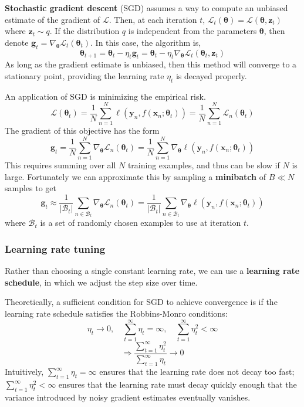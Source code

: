 \documentclass[11pt]{article}
\begin{document}
\textbf{Stochastic gradient descent} (SGD) assumes a way to compute an unbiased estimate of the gradient of $\mathcal{L}$.
Then, at each iteration $t$, $\mathcal{L}_t(\boldsymbol{\theta}) = \mathcal{L}(\boldsymbol{\theta}, \boldsymbol{z}_t)$ where $\boldsymbol{z}_t \sim q$.
If the distribution $q$ is independent from the parameters $\boldsymbol{\theta}$, then denote $\boldsymbol{g}_t = \nabla_{\boldsymbol{\theta}} \mathcal{L}_t(\boldsymbol{\theta}_t)$.
In this case, the algorithm is,
\[
\boldsymbol{\theta}_{t+1} = \boldsymbol{\theta}_t - \eta_t \boldsymbol{g}_t = \boldsymbol{\theta}_t - \eta_t \nabla_{\boldsymbol{\theta}} \mathcal{L}_t(\boldsymbol{\theta}_t, \boldsymbol{z}_t)
\]
As long as the gradient estimate is unbiased, then this method will converge to a stationary point, providing the learning rate $\eta_t$ is decayed properly.

An application of SGD is minimizing the empirical risk. 
\[
\mathcal{L}(\boldsymbol{\theta}_t) = \frac{1}{N} \sum_{n=1}^{N} \ell(\boldsymbol{y}_n, f(\boldsymbol{x}_n; \boldsymbol{\theta}_t)) = \frac{1}{N} \sum_{n=1}^{N} \mathcal{L}_n(\boldsymbol{\theta}_t)
\]
The gradient of this objective has the form
\[
\boldsymbol{g}_t = \frac{1}{N} \sum_{n=1}^{N} \nabla_{\boldsymbol{\theta}} \mathcal{L}_n(\boldsymbol{\theta}_t) = \frac{1}{N} \sum_{n=1}^{N} \nabla_{\boldsymbol{\theta}} \ell(\boldsymbol{y}_n, f(\boldsymbol{x}_n; \boldsymbol{\theta}_t))
\]
This requires summing over all $N$ training examples, and thus can be slow if $N$ is large. Fortunately we can approximate this by sampling a \textbf{minibatch} of $B \ll N$ samples to get
\[
\boldsymbol{g}_t \approx \frac{1}{|\mathcal{B}_t|} \sum_{n \in \mathcal{B}_t} \nabla_{\boldsymbol{\theta}} \mathcal{L}_n(\boldsymbol{\theta}_t) = \frac{1}{|\mathcal{B}_t|} \sum_{n \in \mathcal{B}_t} \nabla_{\boldsymbol{\theta}} \ell(\boldsymbol{y}_n, f(\boldsymbol{x}_n; \boldsymbol{\theta}_t))
\]
where $\mathcal{B}_t$ is a set of randomly chosen examples to use at iteration $t$.

\subsubsection*{Learning rate tuning}
Rather than choosing a single constant learning rate, we can use a \textbf{learning rate schedule}, in which we adjust the step size over time. 

Theoretically, a sufficient condition for SGD to achieve convergence is if the learning rate schedule satisfies the Robbins-Monro conditions:
\[
\eta_t \to 0, \quad \sum_{t=1}^{\infty} \eta_t = \infty, \quad \sum_{t=1}^{\infty} \eta_t^2 < \infty
\]
\[
\Rightarrow \frac{\sum_{t=1}^{\infty} \eta_t^2}{\sum_{t=1}^{\infty} \eta_t} \to 0
\]
Intuitively, $\sum_{t=1}^{\infty} \eta_t = \infty$ ensures that the learning rate does not decay too fast;
$\sum_{t=1}^{\infty} \eta_t^2 < \infty$ ensures that the learning rate must decay quickly enough that the variance introduced by noisy gradient estimates eventually vanishes. 
\end{document}
